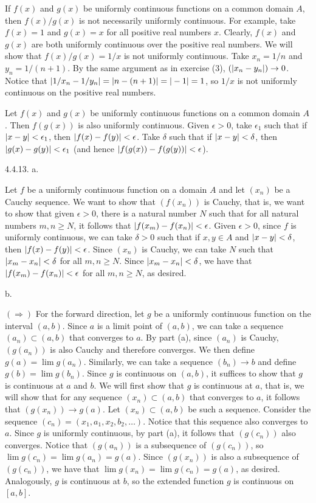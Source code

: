 If $f(x)$ and $g(x)$ be uniformly continuous functions on a common domain $A$,
then $f(x) / g(x)$ is not necessarily uniformly continuous.
For example, take $f(x) = 1$ and $g(x) = x$ for all positive real numbers $x$.
Clearly, $f(x)$ and $g(x)$ are both uniformly continuous
over the positive real numbers.
We will show that $f(x) / g(x) = 1/x$ is not uniformly continuous.
Take $x_n = 1/n$ and $y_n = 1/(n + 1)$.
By the same argument as in exercise (3), $(\vert x_n - y_n\vert) \to 0$.
Notice that $\vert1/x_n - 1/y_n\vert = \vert n - (n + 1)\vert = \vert-1\vert = 1$,
so $1/x$ is not uniformly continuous on the positive real numbers.

Let $f(x)$ and $g(x)$ be uniformly continuous functions on a common domain $A$.
Then $f(g(x))$ is also uniformly continuous.
Given $\epsilon > 0$, take $\epsilon _1$ such that
if $\vert x - y\vert < \epsilon _1$, then $\vert f(x) - f(y)\vert < \epsilon$.
Take $\delta$ such that if $\vert x - y\vert < \delta$,
then $\vert g(x) - g(y)\vert < \epsilon _1$
(and hence $\vert f(g(x)) - f(g(y))\vert < \epsilon$).
\bigskip
\item{4.4.13.} a.

Let $f$ be a uniformly continuous function on a domain $A$ and
let $(x_n)$ be a Cauchy sequence.
We want to show that $(f(x_n))$ is Cauchy, that is,
we want to show that given $\epsilon > 0$,
there is a natural number $N$ such that for all natural numbers $m, n \ge N$,
it follows that $\vert f(x_m) - f(x_n)\vert < \epsilon$.
Given $\epsilon > 0$, since $f$ is uniformly continuous,
we can take $\delta > 0$ such that if $x, y \in A$ and $\vert x - y\vert < \delta$,
then $\vert f(x) - f(y)\vert < \epsilon$.
Since $(x_n)$ is Cauchy, we can take $N$ such that
$\vert x_m - x_n\vert < \delta$ for all $m, n \ge N$.
Since $\vert x_m - x_n\vert < \delta$, we have that
$\vert f(x_m) - f(x_n)\vert < \epsilon$ for all $m, n \ge N$, as desired.
\medskip
\item{} b.

$(\Rightarrow)$ For the forward direction, let $g$
be a uniformly continuous function on the interval $(a, b)$.
Since $a$ is a limit point of $(a, b)$, we can take a sequence
$(a_n) \subset (a, b)$ that converges to $a$.
By part (a), since $(a_n)$ is Cauchy,
$(g(a_n))$ is also Cauchy and therefore converges.
We then define $g(a) = \lim g(a_n)$.
Similarly, we can take a sequence $(b_n) \to b$
and define $g(b) = \lim g(b_n)$.
Since $g$ is continuous on $(a, b)$,
it suffices to show that $g$ is continuous at $a$ and $b$.
We will first show that $g$ is continuous at $a$,
that is, we will show that for any sequence $(x_n) \subset (a, b)$
that converges to $a$, it follows that $(g(x_n)) \to g(a)$.
Let $(x_n) \subset (a, b)$ be such a sequence.
Consider the sequence $(c_n) = (x_1, a_1, x_2, b_2, \ldots)$.
Notice that this sequence also converges to $a$.
Since $g$ is uniformly continuous, by part (a),
it follows that $(g(c_n))$ also converges.
Notice that $(g(a_n))$ is a subsequence of $(g(c_n))$,
so $\lim g(c_n) = \lim g(a_n) = g(a)$.
Since $(g(x_n))$ is also a subsequence of $(g(c_n))$,
we have that $\lim g(x_n) = \lim g(c_n) = g(a)$, as desired.
Analogously, $g$ is continuous at $b$,
so the extended function $g$ is continuous on $[a, b]$.

